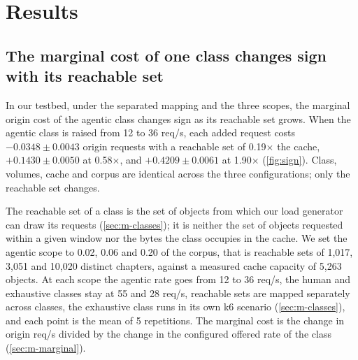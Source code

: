 \section{Results}\label{sec:results}

\subsection{The marginal cost of one class changes sign with its reachable set}\label{sec:r-sign}
In our testbed, under the separated mapping and the three scopes, the marginal origin
cost of the agentic class changes sign as its reachable set grows.
When the agentic class is raised from 12 to 36 req/s, each added request costs
$-0.0348 \pm 0.0043$ origin requests with a reachable set of 0.19$\times$ the cache,
$+0.1430 \pm 0.0050$ at 0.58$\times$, and $+0.4209 \pm 0.0061$ at 1.90$\times$
(\cref{fig:sign}).
Class, volumes, cache and corpus are identical across the three configurations; only
the reachable set changes.

The reachable set of a class is the set of objects from which our load generator can draw
its requests (\cref{sec:m-classes}); it is neither the set of objects requested within a
given window nor the bytes the class occupies in the cache.
We set the agentic scope to 0.02, 0.06 and 0.20 of the corpus, that is reachable sets of
1,017, 3,051 and 10,020 distinct chapters, against a measured cache capacity of 5,263
objects.
At each scope the agentic rate goes from 12 to 36 req/s, the human and exhaustive classes
stay at 55 and 28 req/s, reachable sets are mapped separately across classes, the
exhaustive class runs in its own k6 scenario (\cref{sec:m-classes}), and each point is the
mean of 5 repetitions.
The marginal cost is the change in origin req/s divided by the change in the configured
offered rate of the class (\cref{sec:m-marginal}).

